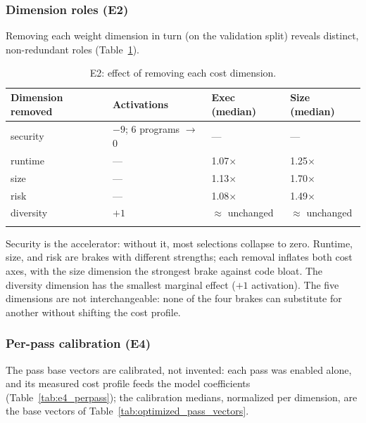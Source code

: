 \documentclass[pdflatex,sn-mathphys-num]{sn-jnl}
\theoremstyle{thmstyleone}%
\theoremstyle{thmstyletwo}%
\theoremstyle{thmstylethree}%
\begin{document}
\subsubsection{Dimension roles (E2)}
Removing each weight dimension in turn (on the validation split) reveals distinct,
non-redundant roles (Table~\ref{tab:e2_roles}).

\begin{table}[!t]
\centering
\footnotesize
\caption{E2: effect of removing each cost dimension.}
\label{tab:e2_roles}
\begin{tabular}{llll}
\toprule
Dimension removed & Activations & Exec (median) & Size (median) \\
\midrule
security & $-9$; 6 programs $\to$ 0 & --- & --- \\
runtime & --- & 1.07$\times$ & 1.25$\times$ \\
size & --- & 1.13$\times$ & 1.70$\times$ \\
risk & --- & 1.08$\times$ & 1.49$\times$ \\
diversity & $+1$ & $\approx$ unchanged & $\approx$ unchanged \\
\botrule
\end{tabular}
\end{table}

Security is the accelerator: without it, most selections collapse to zero. Runtime,
size, and risk are brakes with different strengths; each removal inflates both cost
axes, with the size dimension the strongest brake against code bloat. The diversity
dimension has the smallest marginal effect ($+1$ activation). The five dimensions
are not interchangeable: none of the four brakes can substitute for another
without shifting the cost profile.

\subsubsection{Per-pass calibration (E4)}
The pass base vectors are calibrated, not invented: each pass was enabled alone, and
its measured cost profile feeds the model coefficients (Table~\ref{tab:e4_perpass});
the calibration medians, normalized per dimension, are the base vectors of
Table~\ref{tab:optimized_pass_vectors}.
\end{document}
